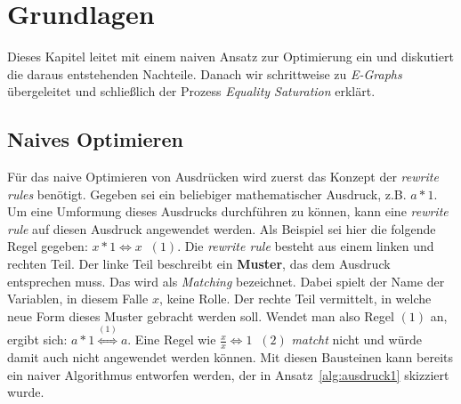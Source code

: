 \section{Grundlagen}\label{sec:grundlagen}


Dieses Kapitel leitet mit einem naiven Ansatz zur Optimierung ein und diskutiert die daraus entstehenden Nachteile. Danach wir schrittweise zu \textit{E-Graphs}
übergeleitet und schließlich der Prozess \textit{Equality Saturation} erklärt.

\subsection{Naives Optimieren}

Für das naive Optimieren von Ausdrücken wird zuerst das Konzept der \textit{rewrite rules} benötigt. Gegeben sei ein beliebiger mathematischer Ausdruck, z.B.
$a * 1$. Um eine Umformung dieses Ausdrucks durchführen zu können, kann eine \textit{rewrite rule} auf diesen Ausdruck angewendet werden.
Als Beispiel sei hier die folgende Regel gegeben: $x * 1 \Leftrightarrow x \;\; (1)$. Die \textit{rewrite rule} besteht aus einem linken und rechten Teil. Der linke Teil
beschreibt ein \textbf{Muster}, das dem Ausdruck entsprechen muss. Das wird als \textit{Matching} bezeichnet. Dabei spielt der Name der Variablen, in diesem Falle $x$, keine Rolle.
Der rechte Teil vermittelt, in welche neue Form dieses Muster gebracht werden soll. Wendet man also Regel $(1)$ an,
ergibt sich: $a * 1  \overset{(1)}{\Leftrightarrow} a$. 
Eine Regel wie $\frac{x}{x} \Leftrightarrow 1 \;\; (2)$ \textit{matcht} nicht und würde damit auch nicht angewendet werden können.
Mit diesen Bausteinen kann bereits ein naiver Algorithmus entworfen werden, der in Ansatz~\ref{alg:ausdruck1} skizziert wurde. 



